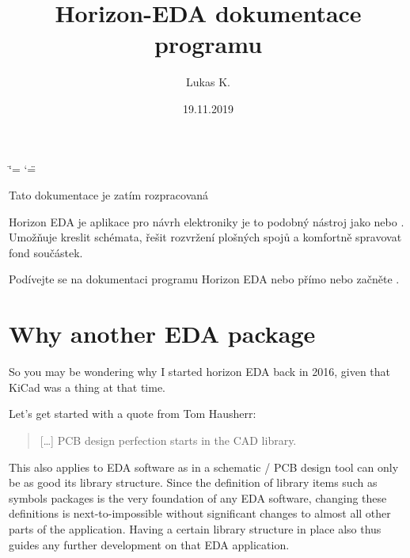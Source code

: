 \documentclass[letterpaper,10pt,czech]{sphinxmanual}
\title{Horizon-EDA dokumentace programu}
\date{19.11.2019}
\author{Lukas K.}
\begin{document}
\ifdefined\shorthandoff
  \ifnum\catcode`\=\string=\active\shorthandoff{=}\fi
  \ifnum\catcode`\"=\active{}\fi
\fi

\pagestyle{empty}
\sphinxmaketitle
\pagestyle{plain}
\sphinxtableofcontents
\pagestyle{normal}
\label{\detokenize{index::doc}}


Tato dokumentace je zatím rozpracovaná

Horizon EDA je aplikace pro návrh elektroniky  je to podobný nástroj jako  nebo . Umožňuje kreslit schémata, řešit rozvržení plošných spojů a komfortně spravovat fond součástek.

Podívejte se na dokumentaci programu Horizon EDA {\hyperref[\detokenize{feature-overview::doc}]{}} nebo přímo {\hyperref[\detokenize{installation::doc}]{}} nebo začněte {\hyperref[\detokenize{why-another-eda-package::doc}]{}}.

\noindent{}


\chapter{Why another EDA package}
\label{\detokenize{why-another-eda-package:why-another-eda-package}}\label{\detokenize{why-another-eda-package::doc}}
So you may be wondering why I started horizon EDA back in 2016, given
that KiCad was a thing at that time.

Let’s get started with a quote from Tom Hausherr: 
\begin{quote}

{[}…{]} PCB design perfection starts in the CAD library.
\end{quote}

This also applies to EDA software as in a schematic / PCB design tool
can only be as good its library structure. Since the definition of
library items such as symbols packages is the very foundation of any
EDA software, changing these definitions is next-to-impossible without
significant changes to almost all other parts of the application.
Having a certain library structure in place also thus guides any further
development on that EDA application.
\end{document}
